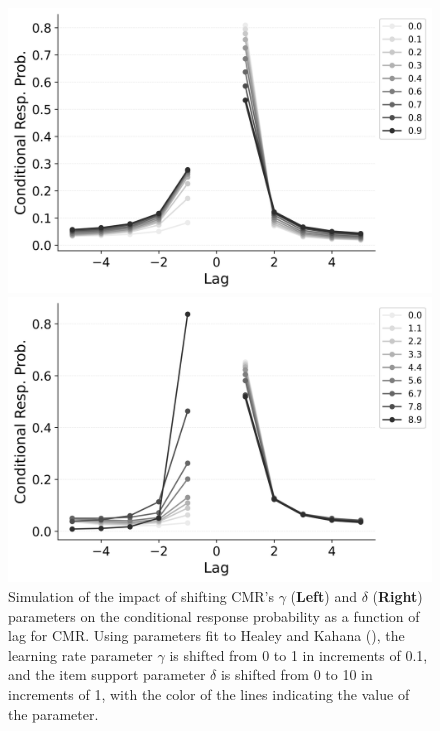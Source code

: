 \documentclass[
  man,
  floatsintext,
  longtable,
  nolmodern,
  notxfonts,
  notimes,
  draftfirst,
  colorlinks=true,linkcolor=blue,citecolor=blue,urlcolor=blue]{apa7}
\begin{document}
\begin{figure}

\caption{\label{fig-shiftlearning}Simulation of the impact of shifting
CMR's \(\gamma\) (\textbf{Left}) and \(\delta\) (\textbf{Right})
parameters on the conditional response probability as a function of lag
for CMR. Using parameters fit to Healey and Kahana
(), the learning rate parameter
\(\gamma\) is shifted from 0 to 1 in increments of 0.1, and the item
support parameter \(\delta\) is shifted from 0 to 10 in increments of 1,
with the color of the lines indicating the value of the parameter.}

\begin{minipage}{0.50\linewidth}
\includegraphics{shifting/bw_BaseCMR_Learning_Rate_Parameter_Shifting_crp_HealeyKahana2014.png}\end{minipage}%
%
\begin{minipage}{0.50\linewidth}
\includegraphics{shifting/bw_BaseCMR_Item_Support_Parameter_Shifting_crp_HealeyKahana2014.png}\end{minipage}%

\end{figure}%
\end{document}
